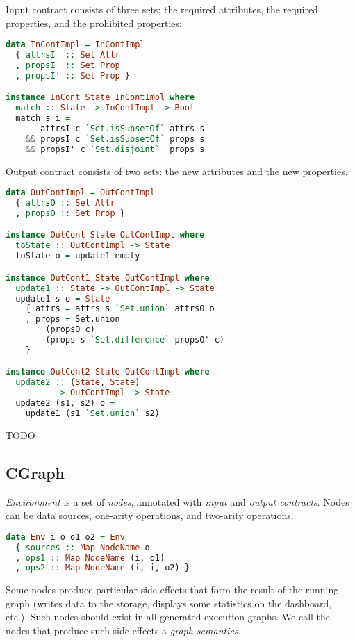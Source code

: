 Input contract consists of three sets: the required attributes, the required properties, and the prohibited properties:

\begin{lstlisting}[language=Haskell]
data InContImpl = InContImpl
  { attrsI  :: Set Attr
  , propsI  :: Set Prop
  , propsI' :: Set Prop }

instance InCont State InContImpl where
  match :: State -> InContImpl -> Bool
  match s i =
       attrsI c `Set.isSubsetOf` attrs s
    && propsI c `Set.isSubsetOf` props s
    && propsI' c `Set.disjoint`  props s
\end{lstlisting}

Output contract consists of two sets: the new attributes and the new properties.

\begin{lstlisting}[language=Haskell]
data OutContImpl = OutContImpl
  { attrsO :: Set Attr
  , propsO :: Set Prop }

instance OutCont State OutContImpl where
  toState :: OutContImpl -> State
  toState o = update1 empty

instance OutCont1 State OutContImpl where
  update1 :: State -> OutContImpl -> State
  update1 s o = State
    { attrs = attrs s `Set.union` attrsO o
    , props = Set.union
        (propsO c)
        (props s `Set.difference` propsO' c)
    }

instance OutCont2 State OutContImpl where
  update2 :: (State, State)
          -> OutContImpl -> State
  update2 (s1, s2) o =
    update1 (s1 `Set.union` s2)
\end{lstlisting}

TODO

\subsection{CGraph}

{\em Environment} is a set of {\em nodes}, annotated with {\em input} and {\em output contracts}.
Nodes can be data sources, one-arity operations, and two-arity operations.

\begin{lstlisting}[language=Haskell]
data Env i o o1 o2 = Env
  { sources :: Map NodeName o
  , ops1 :: Map NodeName (i, o1)
  , ops2 :: Map NodeName (i, i, o2) }
\end{lstlisting}

Some nodes produce particular side effects that form the result of the running graph (writes data to the storage, displays some statistics on the dashboard, etc.).
Such nodes should exist in all generated execution graphs.
We call the nodes that produce such side effects a {\em graph semantics}.


